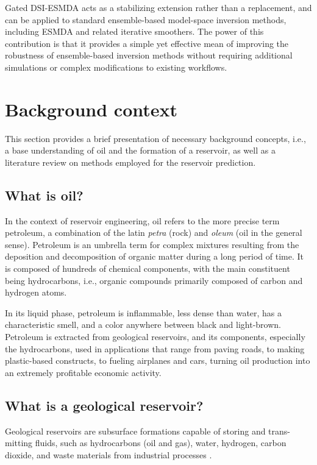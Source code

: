    Gated DSI-ESMDA acts as a stabilizing extension rather than a replacement, 
    and can be applied to standard ensemble-based model-space inversion methods, including ESMDA and related iterative smoothers.
    The power of this contribution is that it provides a simple yet effective mean of improving the robustness of ensemble-based inversion methods 
    without requiring additional simulations or complex modifications to existing workflows.
    
\section{Background context}

    This section provides a brief presentation of necessary background concepts, i.e., 
    a base understanding of oil and the formation of a reservoir,
    as well as a literature review on methods employed for the reservoir prediction. 

    \subsection{What is oil?}
    In the context of reservoir engineering, oil refers to the more precise term petroleum, 
    a combination of the latin \emph{petra} (rock) and \emph{oleum} (oil in the general sense).
    Petroleum is an umbrella term for complex mixtures resulting from the deposition and decomposition 
    of organic matter during a long period of time.
    It is composed of hundreds of chemical components, 
    with the main constituent being hydrocarbons, 
    i.e., organic compounds primarily composed of carbon and hydrogen atoms.
    
    In its liquid phase, petroleum is inflammable, less dense than water, has a characteristic smell,
    and a color anywhere between black and light-brown.
    Petroleum is extracted from geological reservoirs, and its components, 
    especially the hydrocarbons, used in applications that range from 
    paving roads, to making plastic-based constructs, to fueling airplanes and cars, 
    turning oil production into an extremely profitable economic activity.      

    \subsection{What is a geological reservoir?}
    Geological reservoirs are subsurface formations capable of storing and trans-
    mitting fluids, such as hydrocarbons (oil and gas), water, hydrogen,
    carbon dioxide, and waste materials from industrial processes
    \cite[section 1.1]{Emerick:2025}. 


